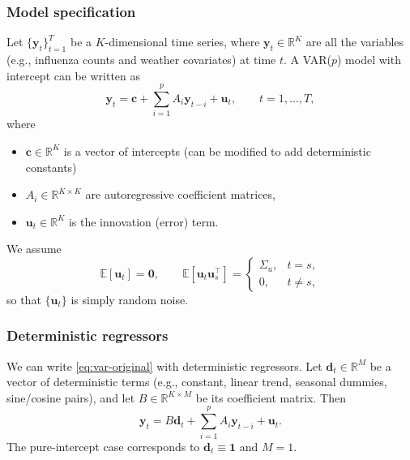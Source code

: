 \documentclass[11pt]{article}
\begin{document}
\subsubsection{Model specification}

Let $\{\mathbf{y}_t\}_{t=1}^T$ be a $K$-dimensional time series, where
$\mathbf{y}_t \in \mathbb{R}^K$ are all the variables (e.g., influenza
counts and weather covariates) at time $t$.
A VAR($p$) model with intercept can be written as
\begin{equation}
  \mathbf{y}_t
  = \mathbf{c}
  + \sum_{i=1}^p A_i \mathbf{y}_{t-i}
  + \mathbf{u}_t,
  \qquad t = 1,\dots,T,
  \label{eq:var-original}
\end{equation}
where
\begin{itemize}[leftmargin=1.5em]
  \item $\mathbf{c} \in \mathbb{R}^K$ is a vector of intercepts (can be modified to add deterministic constants)
  \item $A_i \in \mathbb{R}^{K \times K}$ are autoregressive coefficient matrices,
  \item $\mathbf{u}_t \in \mathbb{R}^K$ is the innovation (error) term.
\end{itemize}
We assume
\begin{equation}
  \mathbb{E}[\mathbf{u}_t] = \mathbf{0}, \qquad
  \mathbb{E}[\mathbf{u}_t \mathbf{u}_s^\top] =
    \begin{cases}
      \Sigma_u, & t = s, \\
      0, & t \neq s,
    \end{cases}
\end{equation}
so that $\{\mathbf{u}_t\}$ is simply random noise.

\subsubsection{Deterministic regressors}

We can write \cref{eq:var-original} with deterministic
regressors. Let $\mathbf{d}_t \in \mathbb{R}^M$ be a vector of deterministic
terms (e.g., constant, linear trend, seasonal dummies, sine/cosine pairs),
and let $B \in \mathbb{R}^{K \times M}$ be its coefficient matrix. Then
\begin{equation}
  \mathbf{y}_t
  = B \mathbf{d}_t
  + \sum_{i=1}^p A_i \mathbf{y}_{t-i}
  + \mathbf{u}_t.
  \label{eq:var-det}
\end{equation}
The pure-intercept case corresponds to $\mathbf{d}_t \equiv \mathbf{1}$ and
$M = 1$.
\end{document}
